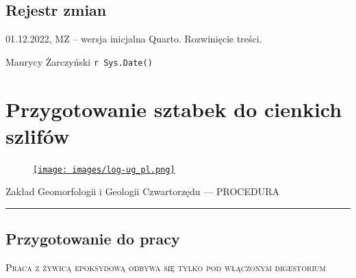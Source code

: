 \documentclass[
  letterpaper,
  DIV=11,
  numbers=noendperiod]{scrreprt}
\begin{document}
\hypertarget{rejestr-zmian-14}{%
\section{Rejestr zmian}\label{rejestr-zmian-14}}

01.12.2022, MZ -- wersja inicjalna Quarto. Rozwinięcie treści.

Maurycy Żarczyński \texttt{r\ Sys.Date()}

\hypertarget{przygotowanie-sztabek-do-cienkich-szlifuxf3w}{%
\chapter{Przygotowanie sztabek do cienkich
szlifów}\label{przygotowanie-sztabek-do-cienkich-szlifuxf3w}}

\begin{figure}

\href{https://geomorfologia.ug.edu.pl}{\texttt{[image: images/log-ug\_pl.png]}}

\end{figure}

Zakład Geomorfologii i Geologii Czwartorzędu --- PROCEDURA

\begin{center}\rule{0.5\linewidth}{0.5pt}\end{center}

\hypertarget{przygotowanie-do-pracy-7}{%
\section{Przygotowanie do pracy}\label{przygotowanie-do-pracy-7}}

\textsc{Praca z żywicą epoksydową odbywa się tylko pod włączonym
digestorium}
\end{document}
